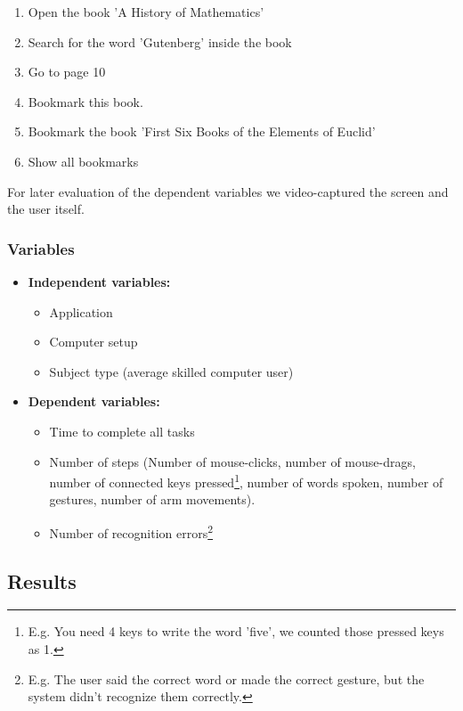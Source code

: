 \documentclass[a4paper, 10pt]{article}
\begin{document}
	\begin{enumerate}
		\item Open the book 'A History of Mathematics'
		\item Search for the word 'Gutenberg' inside the book
		\item Go to page 10
		\item Bookmark this book.
		\item Bookmark the book 'First Six Books of the Elements of Euclid'
		\item Show all bookmarks
	\end{enumerate}
	
	\par{For later evaluation of the dependent variables we video-captured the screen and the user itself.}
	
	\subsubsection{Variables}
	
	\begin{itemize}
		\item \textbf{Independent variables:}
		\begin{itemize}
			\item Application
			\item Computer setup
			\item Subject type (average skilled computer user)
		\end{itemize}
		\item \textbf{Dependent variables:}
		\begin{itemize}
			\item Time to complete all tasks
			\item Number of steps (Number of mouse-clicks, number of mouse-drags, number of connected keys pressed\footnote{E.g. You need 4 keys to write the word 'five', we counted those pressed keys as 1.}, number of words spoken, number of gestures, number of arm movements).
			\item Number of recognition errors\footnote{E.g. The user said the correct word or made the correct gesture, but the system didn't recognize them correctly.}
	\end{itemize}
	\end{itemize}		
	
	\subsection{Results}
	
\end{document}
